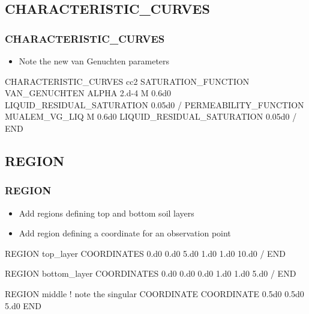 \documentclass{beamer}
\newcommand\bluecomment[1]{{{\color{blue} #1}}}
\newcommand\magentacomment[1]{{{\color{magenta} #1}}}
\begin{document}
\subsection{CHARACTERISTIC\_CURVES}

\begin{frame}[fragile]\frametitle{CHARACTERISTIC\_CURVES}

\begin{itemize}
\item Note the new van Genuchten parameters
\end{itemize}

\begin{semiverbatim}
\magentacomment{
CHARACTERISTIC_CURVES cc2
  SATURATION_FUNCTION VAN_GENUCHTEN
    ALPHA 2.d-4
    M 0.6d0
    LIQUID_RESIDUAL_SATURATION 0.05d0
  /
  PERMEABILITY_FUNCTION MUALEM_VG_LIQ
    M 0.6d0
    LIQUID_RESIDUAL_SATURATION 0.05d0
  /
END}

\end{semiverbatim}

\end{frame}

\subsection{REGION}

\begin{frame}\frametitle{REGION}

\begin{itemize}
  \item Add regions defining top and bottom soil layers
  \item Add region defining a coordinate for an observation point
\end{itemize}

\begin{semiverbatim}


\magentacomment{
REGION top_layer
  COORDINATES
    0.d0 0.d0 5.d0
    1.d0 1.d0 10.d0
  /
END




REGION bottom_layer
  COORDINATES
    0.d0 0.d0 0.d0
    1.d0 1.d0 5.d0
  /
END

REGION middle    \bluecomment{! note the singular COORDINATE}
  COORDINATE 0.5d0 0.5d0 5.d0
END}

\end{semiverbatim}

\end{frame}
\end{document}
